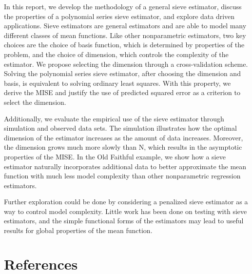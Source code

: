 \documentclass[12pt]{article}  %
\begin{document}
In this report, we develop the methodology of a general sieve estimator, discuss the properties of a polynomial series sieve estimator, and explore data driven applications. Sieve estimators are general estimators and are able to model many different classes of mean functions. Like other nonparametric estimators, two key  choices are the choice of basis function, which is determined by properties of the problem, and the choice of dimension, which controls the complexity of the estimator.  We propose selecting the dimension through a cross-validation scheme. Solving the polynomial series sieve estimator, after choosing the dimension and basis, is equivalent to solving ordinary least squares. With this property, we derive the MISE and justify the use of predicted squared error as a criterion to select the dimension. 

Additionally, we evaluate the empirical use of the sieve estimator through simulation and observed data sets. The simulation illustrates how the optimal dimension of the estimator increases as the amount of data increases. Moreover, the dimension grows much more slowly than N, which results in the asymptotic properties of the  MISE.  In the Old Faithful example, we show how a sieve estimator naturally incorporates additional data to better approximate the mean function with much less model complexity than other nonparametric regression estimators. 

Further exploration could be done by considering a penalized sieve estimator as a way to control model complexity. Little work has been done on testing with sieve estimators, and the simple functional forms of the estimators may lead to useful results for global properties of the mean function. 


\section{References}
\nocite{*}
\printbibliography[heading=none]
\end{document}
